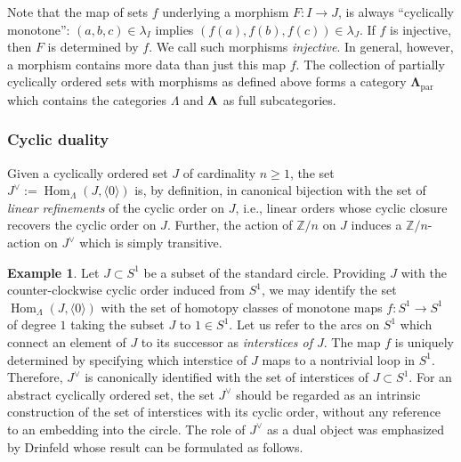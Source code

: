 \documentclass[english,11pt,leqno]{article}
\def\ZZ{\mathbb{Z}}
\def\Hom{\operatorname{Hom}}
\def\on{\operatorname}
\def\Hom{\operatorname{Hom}}
\theoremstyle{definition}
\newtheorem{exa}[thm]{Example}
\theoremstyle{remark}
\numberwithin{equation}{section}
\begin{document}
Note that the map of sets $f$ underlying a morphism $F: I\to J$, is always ``cyclically monotone'':
$(a,b,c)\in\lambda_I$ implies $(f(a), f(b), f(c))\in\lambda_J$. If $f$ is injective, then $F$ is
determined by $f$. We call such morphisms {\em injective}. In general, however, a morphism
contains more data than just this map $f$.
The collection of partially cyclically ordered sets with morphisms as defined above forms a category
${\mathbf \Lambda}_{\on{par}}$ which contains the categories $\Lambda$ and ${\bf \Lambda}$ as full
subcategories.


\subsubsection{Cyclic duality}
  Given a cyclically
ordered set $J$ of cardinality $n \ge 1$,  the set $J^{\vee} := \Hom_{\Lambda}(J, \langle 0\rangle)$
 is, by definition, in canonical bijection with the
set of {\em linear refinements} of the cyclic order on $J$, i.e., linear orders whose cyclic closure recovers 
the cyclic order on $J$. Further, the action of $\ZZ/n$ on $J$ induces a $\ZZ/n$-action on
$J^{\vee}$ which is simply transitive. 

\begin{exa} Let $J \subset S^1$ be a subset of the standard circle. Providing $J$ with the
	counter-clockwise cyclic order induced from $S^1$, we may identify the set
	$\Hom_{\Lambda}(J, \langle 0\rangle)$ with the set of  homotopy classes of monotone maps $f: S^1 \to S^1$
	of degree $1$ taking the subset $J$ to $1 \in S^1$. Let us refer to the arcs on $S^1$ which
	connect an element of $J$ to its successor as {\em interstices of $J$}. The map $f$ is
	uniquely determined by specifying which interstice of $J$ maps to a nontrivial loop in
	$S^1$. Therefore, $J^{\vee}$ is canonically identified with the set of interstices of $J
	\subset S^1$. For an abstract cyclically ordered set, the set $J^{\vee}$ should be regarded
	as an intrinsic construction of the set of interstices with its cyclic order, without any
	reference to an embedding into the circle. The role of $J^\vee$ as a dual object was emphasized
	by Drinfeld \cite{drinfeld:cyclic} whose result can be formulated as follows. 
	
\end{exa}
\end{document}

